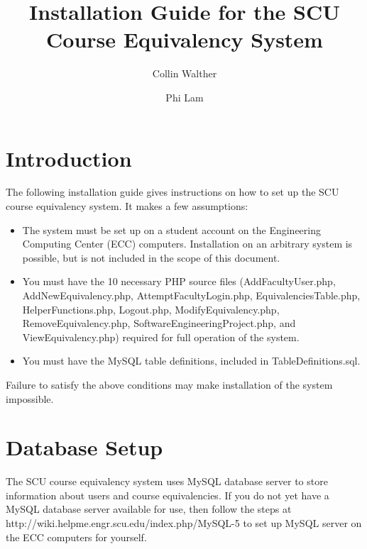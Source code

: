 \documentclass{article}
\author{Collin Walther \and Phi Lam}
\title{Installation Guide for the SCU Course Equivalency System}
\begin{document}
\maketitle

\section{Introduction}
\par The following installation guide gives instructions on how to set up the
SCU course equivalency system. It makes a few assumptions:
\begin{itemize}
\item The system must be set up on a student account on the Engineering Computing
Center (ECC) computers.
Installation on an arbitrary system is possible, but is not included in the scope
of this document.
\item You must have the 10 necessary PHP source files
(AddFacultyUser.php, AddNewEquivalency.php, AttemptFacultyLogin.php,
EquivalenciesTable.php, HelperFunctions.php, Logout.php, ModifyEquivalency.php,
RemoveEquivalency.php, SoftwareEngineeringProject.php, and ViewEquivalency.php)
required for full operation of the system.
\item You must have the MySQL table definitions, included in
TableDefinitions.sql.
\end{itemize}
Failure to satisfy the above conditions may make installation of the system
impossible.

\section{Database Setup}
\par The SCU course equivalency system uses MySQL database server to store
information about users and course equivalencies. If you do not yet have a MySQL
database server available for use, then follow the steps at
http://wiki.helpme.engr.scu.edu/index.php/MySQL-5 to set up MySQL server on the
ECC computers for yourself.
\end{document}
